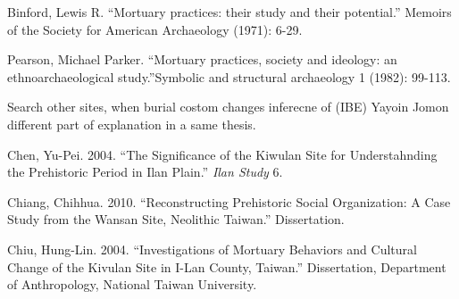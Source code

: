\documentclass[10pt]{article}
\begin{document}
Binford, Lewis R. ``Mortuary practices: their study and their
potential.'' Memoirs of the Society for American Archaeology (1971):
6-29.

Pearson, Michael Parker. ``Mortuary practices, society and ideology: an
ethnoarchaeological study.''Symbolic and structural archaeology 1
(1982): 99-113.

Search other sites, when burial costom changes inferecne of (IBE) Yayoin
Jomon different part of explanation in a same thesis.

Chen, Yu-Pei. 2004. ``The Significance of the Kiwulan Site for
Understahnding the Prehistoric Period in Ilan Plain.'' \emph{Ilan Study}
6.

Chiang, Chihhua. 2010. ``Reconstructing Prehistoric Social Organization:
A Case Study from the Wansan Site, Neolithic Taiwan.'' Dissertation.

Chiu, Hung-Lin. 2004. ``Investigations of Mortuary Behaviors and
Cultural Change of the Kivulan Site in I-Lan County, Taiwan.''
Dissertation, Department of Anthropology, National Taiwan University.
\end{document}
